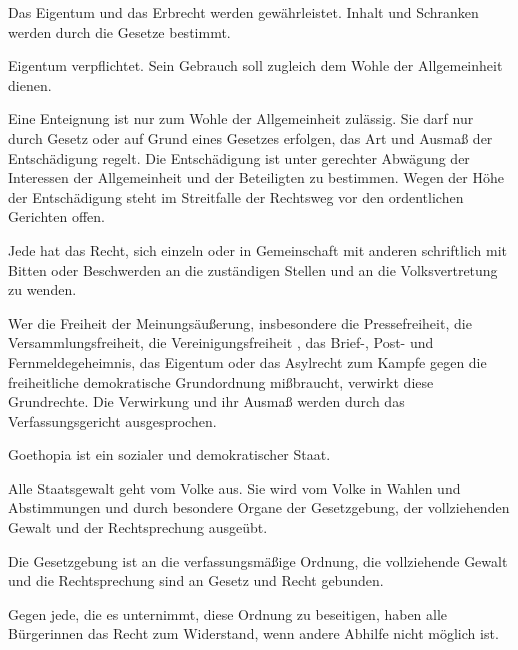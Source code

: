 \documentclass{sasbase}
\begin{document}
\begin{article}
	\item Das Eigentum und das Erbrecht werden gewährleistet. Inhalt und Schranken werden durch die Gesetze bestimmt.
	\item Eigentum verpflichtet. Sein Gebrauch soll zugleich dem Wohle der Allgemeinheit dienen.
	\item Eine Enteignung ist nur zum Wohle der Allgemeinheit zulässig. Sie darf nur durch Gesetz oder auf Grund eines Gesetzes erfolgen, das Art und Ausmaß der Entschädigung regelt. Die Entschädigung ist unter gerechter Abwägung der Interessen der Allgemeinheit und der Beteiligten zu bestimmen. Wegen der Höhe der Entschädigung steht im Streitfalle der Rechtsweg vor den ordentlichen Gerichten offen.
\end{article}

\begin{article}[Demokratiegrundlage]
	\item Jede hat das Recht, sich einzeln oder in Gemeinschaft mit anderen schriftlich mit Bitten oder Beschwerden an die zuständigen Stellen und an die Volksvertretung zu wenden.
\end{article}

\begin{article}
	\item Wer die Freiheit der Meinungsäußerung, insbesondere die Pressefreiheit, die Versammlungsfreiheit, die Vereinigungsfreiheit , das Brief-, Post- und Fernmeldegeheimnis, das Eigentum oder das Asylrecht zum Kampfe gegen die freiheitliche demokratische Grundordnung mißbraucht, verwirkt diese Grundrechte. Die Verwirkung und ihr Ausmaß werden durch das Verfassungsgericht ausgesprochen.
\end{article}


\begin{article}[Staatsform]
	\item Goethopia ist ein sozialer und demokratischer Staat.
	\item Alle Staatsgewalt geht vom Volke aus. Sie wird vom Volke in Wahlen und Abstimmungen und durch besondere Organe der Gesetzgebung, der vollziehenden Gewalt und der Rechtsprechung ausgeübt.
	\item Die Gesetzgebung ist an die verfassungsmäßige Ordnung, die vollziehende Gewalt und die Rechtsprechung sind an Gesetz und Recht gebunden.
	\item Gegen jede, die es unternimmt, diese Ordnung zu beseitigen, haben alle B\"{u}rgerinnen das Recht zum Widerstand, wenn andere Abhilfe nicht möglich ist.
\end{article}
\end{document}
